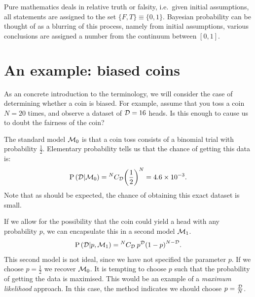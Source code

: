 Pure mathematics deals in relative truth or falsity, i.e.\ given initial assumptions, all statements are assigned to the set \(\{F,T\}\equiv\{0,1\}\). Bayesian probability can be thought of as a blurring of this process, namely from initial assumptions, various conclusions are assigned a number from the continuum between \([0,1]\).

\section{An example: biased coins}
As an concrete introduction to the terminology, we will consider the case of determining whether a coin is biased.
For example, assume that you toss a coin \(N=20\) times, and observe a dataset of \(\mathcal{D} = 16\) heads. Is this enough to cause us to doubt the fairness of the coin?

The standard model \(\mathcal{M}_0\) is that a coin toss consists of a binomial trial with probability \(\frac{1}{2}\). Elementary probability tells us that the chance of getting this data is:
\begin{equation}
  \mathrm{P}\left(\mathcal{D}\middle|\mathcal{M}_0\right)= {^{N}C_{\mathcal{D}}} {\left( \frac{1}{2} \right)}^{N}  = 4.6\times 10^{-3}.
  \label{eqn:bay:M0}
\end{equation}
Note that as should be expected, the chance of obtaining this exact dataset is small. 

If we allow for the possibility that the coin could yield a head with any probability \(p\), we can encapsulate this in a second model \(\mathcal{M}_1\).
\begin{equation}
  \mathrm{P}\left(\mathcal{D}\middle|p,\mathcal{M}_1\right)= {^{N}C_{\mathcal{D}}}\: {p}^{\mathcal{D}} {\left(1 - p \right)}^{N-\mathcal{D}}.
  \label{eqn:bay:M1}
\end{equation}
This second model is not ideal, since we have not specified the parameter \(p\). If we choose \(p=\frac{1}{2}\) we recover \(\mathcal{M}_0\). It is tempting to choose \(p\) such that the probability of getting the data is maximised. This would be an example of a {\em maximum likelihood\/} approach. In this case, the method indicates we should choose \(p = \frac{\mathcal{D}}{N}\). 


